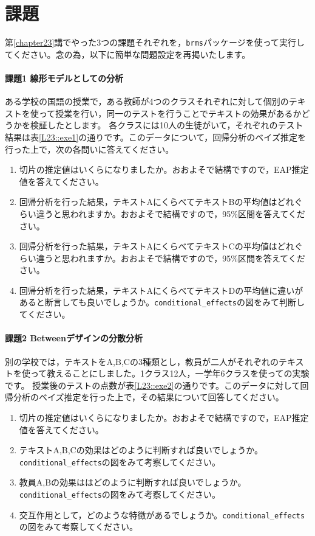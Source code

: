\documentclass{ltjbook}
\begin{document}
\section{課題}
第\ref{chapter23}講でやった3つの課題それぞれを，\texttt{brms}パッケージを使って実行してください。念の為，以下に簡単な問題設定を再掲いたします。
\paragraph{課題1 線形モデルとしての分析}
ある学校の国語の授業で，ある教師が4つのクラスそれぞれに対して個別のテキストを使って授業を行い，同一のテストを行うことでテキストの効果があるかどうかを検証したとします。
各クラスには10人の生徒がいて，それぞれのテスト結果は表\ref{L23::exe1}の通りです。このデータについて，回帰分析のベイズ推定を行った上で，次の各問いに答えてください。

\begin{enumerate}
  \item 切片の推定値はいくらになりましたか。おおよそで結構ですので，EAP推定値を答えてください。
  \item 回帰分析を行った結果，テキストAにくらべてテキストBの平均値はどれぐらい違うと思われますか。おおよそで結構ですので，95\%区間を答えてください。
  \item 回帰分析を行った結果，テキストAにくらべてテキストCの平均値はどれぐらい違うと思われますか。おおよそで結構ですので，95\%区間を答えてください。
  \item 回帰分析を行った結果，テキストAにくらべてテキストDの平均値に違いがあると断言しても良いでしょうか。\verb|conditional_effects|の図をみて判断してください。
\end{enumerate}


\paragraph{課題2 Betweenデザインの分散分析}
別の学校では，テキストをA,B,Cの3種類とし，教員が二人がそれぞれのテキストを使って教えることにしました。1クラス12人，一学年6クラスを使っての実験です。
授業後のテストの点数が表\ref{L23::exe2}の通りです。このデータに対して回帰分析のベイズ推定を行った上で，その結果について回答してください。

\begin{enumerate}
    \item 切片の推定値はいくらになりましたか。おおよそで結構ですので，EAP推定値を答えてください。
    \item テキストA,B,Cの効果はどのように判断すれば良いでしょうか。\verb|conditional_effects|の図をみて考察してください。
    \item 教員A,Bの効果ははどのように判断すれば良いでしょうか。\verb|conditional_effects|の図をみて考察してください。
    \item 交互作用として，どのような特徴があるでしょうか。\verb|conditional_effects|の図をみて考察してください。
\end{enumerate}
\end{document}
